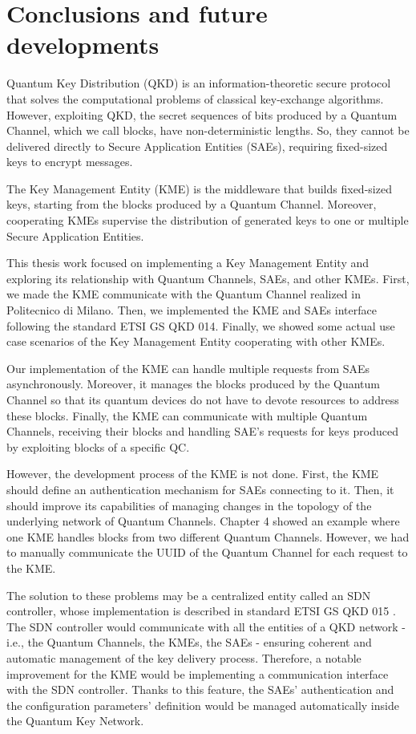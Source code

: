 \chapter{Conclusions and future developments}
\label{ch:conclusions}%

Quantum Key Distribution (QKD) is an information-theoretic secure protocol that solves the computational problems of classical key-exchange algorithms. However, exploiting QKD, the secret sequences of bits produced by a Quantum Channel, which we call blocks, have non-deterministic lengths. So, they cannot be delivered directly to Secure Application Entities (SAEs), requiring fixed-sized keys to encrypt messages.

The Key Management Entity (KME) is the middleware that builds fixed-sized keys, starting from the blocks produced by a Quantum Channel. Moreover, cooperating KMEs supervise the distribution of generated keys to one or multiple Secure Application Entities.

This thesis work focused on implementing a Key Management Entity and exploring its relationship with Quantum Channels, SAEs, and other KMEs. First, we made the KME communicate with the Quantum Channel realized in Politecnico di Milano. Then, we implemented the KME and SAEs interface following the standard ETSI GS QKD 014. Finally, we showed some actual use case scenarios of the Key Management Entity cooperating with other KMEs.

Our implementation of the KME can handle multiple requests from SAEs asynchronously. Moreover, it manages the blocks produced by the Quantum Channel so that its quantum devices do not have to devote resources to address these blocks. Finally, the KME can communicate with multiple Quantum Channels, receiving their blocks and handling SAE's requests for keys produced by exploiting blocks of a specific QC.

However, the development process of the KME is not done. First, the KME should define an authentication mechanism for SAEs connecting to it. Then, it should improve its capabilities of managing changes in the topology of the underlying network of Quantum Channels. Chapter 4 showed an example where one KME handles blocks from two different Quantum Channels. However, we had to manually communicate the UUID of the Quantum Channel for each request to the KME.

The solution to these problems may be a centralized entity called an SDN controller, whose implementation is described in standard ETSI GS QKD 015 \cite{etsi015}. The SDN controller would communicate with all the entities of a QKD network - i.e., the Quantum Channels, the KMEs, the SAEs - ensuring coherent and automatic management of the key delivery process. Therefore, a notable improvement for the KME would be implementing a communication interface with the SDN controller. Thanks to this feature, the SAEs' authentication and the configuration parameters' definition would be managed automatically inside the Quantum Key Network.